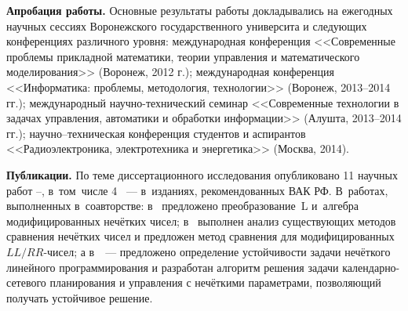 \textbf{Апробация работы.} Основные результаты работы докладывались на ежегодных научных сессиях Воронежского государственного университа и следующих конференциях различного уровня: международная конференция <<Современные проблемы прикладной математики, теории управления и математического моделирования>> (Воронеж, 2012 г.); международная конференция <<Информатика: проблемы, методология, технологии>> (Воронеж, 2013--2014 гг.); международный научно-технический семинар <<Современные технологии в задачах управления, автоматики и обработки информации>> (Алушта, 2013--2014 гг.); научно--техническая конференция студентов и аспирантов <<Радиоэлектроника, электротехника и энергетика>> (Москва, 2014).

\textbf{Публикации.} По теме диссертационного исследования опубликовано 11 научных работ \cite{PMTYMM}--\cite{Kanischeva}, в~том~числе 4 \cite{Kanischeva, Vorontsov_Compare, Vorontsov_PI, Vorontsov_VSTU}~--- в~изданиях, рекомендованных ВАК РФ. В~работах, выполненных в~соавторстве: в~\cite{Vorontsov_PI} предложено преобразование~L и~алгебра модифицированных нечётких чисел; в~\cite{Vorontsov_Compare} выполнен анализ существующих методов сравнения нечётких чисел и предложен метод сравнения для модифицированных $LL/RR$-чисел; а в~\cite{Vorontsov_VSTU}~--- предложено определение устойчивости задачи нечёткого линейного программирования и разработан алгоритм решения задачи календарно-сетевого планирования и управления с нечёткими параметрами, позволяющий получать устойчивое решение.